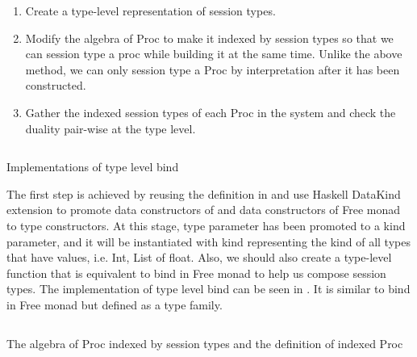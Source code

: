 \begin{enumerate}
    \item Create a type-level representation of session types.
    \item Modify the algebra of Proc to make it indexed by session types so that we can session type a proc while building it at the same time. Unlike the above method, we can only session type a Proc by interpretation after it has been constructed.
    \item Gather the indexed session types of each Proc in the system and check the duality pair-wise at the type level.
\end{enumerate}
\begin{listing}[ht]
    \inputminted{Haskell}{impl/typebind.hs}
    \caption{Implementations of type level bind}
    \label{impl:code:typebind}
\end{listing}
The first step is achieved by reusing the definition in  and use Haskell DataKind extension to promote data constructors of  and data constructors of Free monad to type constructors. At this stage, type parameter  has been promoted to a kind parameter, and it will be instantiated with kind \hask{*} representing the kind of all types that have values, i.e. Int, List of float. Also, we should also create a type-level function that is equivalent to bind in Free monad to help us compose session types. The implementation of type level bind \hask{>*>} can be seen in . It is similar to bind in Free monad but defined as a type family. 
\begin{listing}[ht]
    \inputminted{Haskell}{impl/typeproc.hs}
    \caption{The algebra of Proc indexed by session types and the definition of indexed Proc}
    \label{impl:code:typeproc}
\end{listing}

